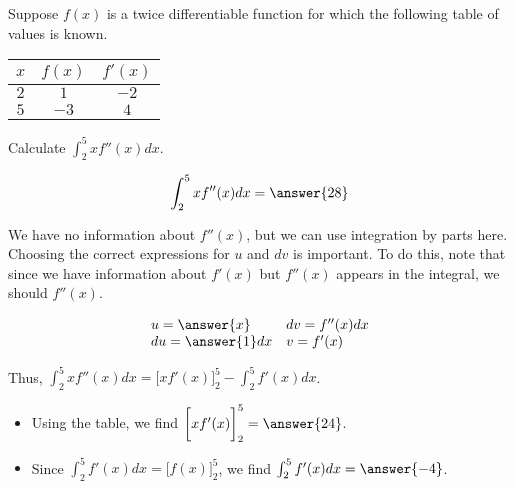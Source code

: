 \documentclass{ximera}
\author{Jim Talamo}
\begin{document}
\begin{exercise}
Suppose $f(x)$ is a twice differentiable function for which the following table of values is known.

\large
\begin{center}
\begin{tabular}{|c|c|c|}
\hline
$x$ & $f(x)$ & $f'(x)$ \\
\hline 
$2$ & $1$ & $-2$ \\
\hline
$5$ & $-3$ & $4$ \\
\hline
\end{tabular}

\end{center}
\normalsize


Calculate $\int_2^5 x f''(x) dx$.

\[
\int_2^5 x f''(x) dx = \answer{28}
\]

\begin{hint}
We have no information about $f''(x)$, but we can use integration by parts here.  Choosing the correct expressions for $u$ and $dv$ is important.  To do this, note that since we have information about $f'(x)$ but $f''(x)$ appears in the integral, we should  $f''(x)$.

\begin{question}
\[\begin{array}{ll}
u = \answer{x}  & dv = f''(x) dx \\
du = \answer{1} dx & v = f'(x)
\end{array}\]

Thus, $\int_2^5 x f''(x) dx = \bigg[x f'(x)\bigg]_2^5-\int_2^5 f'(x) dx$. 

\begin{itemize}
\item Using the table, we find $ \bigg[x f'(x)\bigg]_2^5 = \answer{24}$.
\item Since $\int_2^5 f'(x) dx = \bigg[f(x)\bigg]_2^5$, we find $\int_2^5 f'(x) dx = \answer{-4}$.
\end{itemize}

\end{question}
\end{hint}

\end{exercise}
\end{document}
